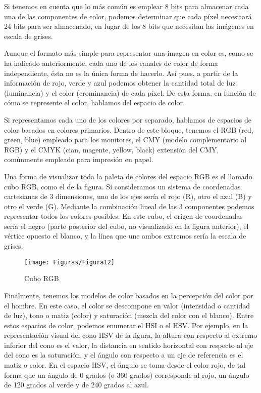 \documentclass[es,practica]{uah}
\begin{document}
Si tenemos en cuenta que lo más común es emplear 8 bits para almacenar cada una de las componentes de color, podemos determinar que cada píxel necesitará 24 bits para ser almacenado, en lugar de los 8 bits que necesitan las imágenes en escala de grises.

Aunque el formato más simple para representar una imagen en color es, como se ha indicado anteriormente, cada uno de los canales de color de forma independiente, ésta no es la única forma de hacerlo. Así pues, a partir de la información de rojo, verde y azul podemos obtener la cantidad total de luz (luminancia) y el color (crominancia) de cada píxel. De esta forma, en función de cómo se represente el color, hablamos del espacio de color.

Si representamos cada uno de los colores por separado, hablamos de espacios de color basados en colores primarios. Dentro de este bloque, tenemos el RGB (red, green, blue) empleado para los monitores, el CMY (modelo complementario al RGB) y el CMYK (cian, magente, yellow, black) extensión del CMY, comúnmente empleado para impresión en papel.

Una forma de visualizar toda la paleta de colores del espacio RGB es el llamado cubo RGB, como el de la figura. Si consideramos un sistema de coordenadas cartesianas de 3 dimensiones, uno de los ejes sería el rojo (R), otro el azul (B) y otro el verde (G). Mediante la combinación lineal de las 3 componentes podemos representar todos los colores posibles. En este cubo, el origen de coordenadas sería el negro (parte posterior del cubo, no visualizado en la figura anterior), el vértice opuesto el blanco, y la línea que une ambos extremos sería la escala de grises.

\begin{figure}[h!]
  \centering
  \texttt{[image: Figuras/Figura12]}
  \caption{Cubo RGB}
  \label{fig:fig12}
\end{figure}


Finalmente, tenemos los modelos de color basados en la percepción del color por el hombre. En este caso, el color se descompone en valor (intensidad o cantidad de luz), tono o matiz (color) y saturación (mezcla del color con el blanco). Entre estos espacios de color, podemos enumerar el HSI o el HSV. Por ejemplo, en la representación visual del cono HSV de la figura, la altura con respecto al extremo inferior del cono es el valor, la distancia en sentido horizontal con respecto al eje del cono es la saturación, y el ángulo con respecto a un eje de referencia es el matiz o color. En el espacio HSV, el ángulo se toma desde el color rojo, de tal forma que un ángulo de 0 grados (o 360 grados) corresponde al rojo, un ángulo de 120 grados al verde y de 240 grados al azul.
\end{document}
